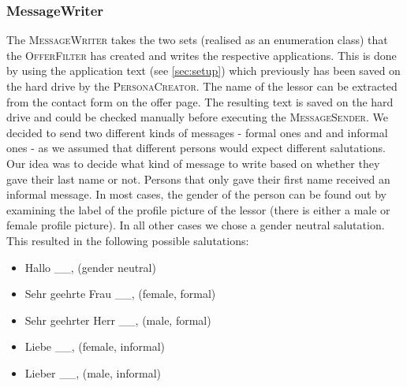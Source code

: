 \documentclass[11pt]{scrartcl}
\begin{document}
\subsubsection{MessageWriter}
\label{sec:messagewriter}
\begin{figure}[H]
        \centering
\end{figure}
The \textsc{MessageWriter} takes the two sets (realised as an enumeration class) that the \textsc{OfferFilter} has created and writes the respective applications. This is done by using the application text (see \ref{sec:setup}) which previously has been saved on the hard drive by the \textsc{PersonaCreator}. The name of the lessor can be extracted from the contact form on the offer page. The resulting text is saved on the hard drive and could be checked manually before executing the \textsc{MessageSender}. \newline
We decided to send two different kinds of messages - formal ones and and informal ones - as we assumed that different persons would expect different salutations. Our idea was to decide what kind of message to write based on whether they gave their last name or not. Persons that only gave their first name received an informal message. In most cases, the gender of the person can be found out by examining the label of the profile picture of the lessor (there is either a male or female profile picture). In all other cases we chose a gender neutral salutation. This resulted in the following possible salutations:

\begin{itemize}
    \item Hallo \_\_, (gender neutral)
    \item Sehr geehrte Frau \_\_, (female, formal)
    \item Sehr geehrter Herr \_\_, (male, formal)
    \item Liebe \_\_, (female, informal)
    \item Lieber \_\_, (male, informal)
\end{itemize}
\end{document}
